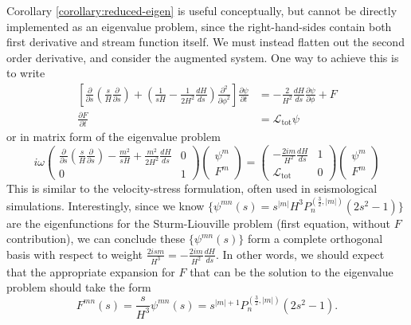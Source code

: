 Corollary \ref{corollary:reduced-eigen} is useful conceptually, but cannot be directly implemented as an eigenvalue problem, since the right-hand-sides contain both first derivative and stream function itself. We must instead flatten out the second order derivative, and consider the augmented system. One way to achieve this is to write
\begin{equation}\label{eqn:reduced-dim-form}
\begin{aligned}
    \left[\frac{\partial}{\partial s}\left(\frac{s}{H}\frac{\partial}{\partial s}\right) + \left(\frac{1}{sH} - \frac{1}{2H^2} \frac{dH}{ds}\right)\frac{\partial^2}{\partial \phi^2}\right] \frac{\partial \psi}{\partial t} &= - \frac{2}{H^2}\frac{dH}{ds} \frac{\partial \psi}{\partial \phi} + F \\ 
    \frac{\partial F}{\partial t} &= \mathcal{L}_\mathrm{tot} \psi
\end{aligned}
\end{equation}
or in matrix form of the eigenvalue problem
\begin{equation}\label{eqn:reduced-dim-matrix-form}
i\omega \begin{pmatrix}
    \frac{\partial}{\partial s}\left(\frac{s}{H}\frac{\partial}{\partial s}\right) - \frac{m^2}{sH} + \frac{m^2}{2H^2} \frac{dH}{ds} & 0 \\ 
    0 & 1
\end{pmatrix} \begin{pmatrix} \psi^m \\ F^m \end{pmatrix} = \begin{pmatrix} -\frac{2im}{H^2} \frac{dH}{ds} & 1 \\ \mathcal{L}_\mathrm{tot} & 0 \end{pmatrix} \begin{pmatrix}
    \psi^m \\ F^m
\end{pmatrix}
\end{equation}
This is similar to the velocity-stress formulation, often used in seismological simulations. Interestingly, since we know $\{\psi^{mn}(s) = s^{|m|}H^3 P_{n}^{(\frac{3}{2}, |m|)}(2s^2 - 1)\}$ are the eigenfunctions for the Sturm-Liouville problem (first equation, without $F$ contribution), we can conclude these $\{\psi^{mn}(s)\}$ form a complete orthogonal basis with respect to weight $\frac{2ism}{H^3} = -\frac{2im}{H^2}\frac{dH}{ds}$. In other words, we should expect that the appropriate expansion for $F$ that can be the solution to the eigenvalue problem should take the form
\[F^{mn}(s) = \frac{s}{H^3} \psi^{mn}(s) = s^{|m|+1} P_n^{(\frac{3}{2},|m|)}(2s^2 - 1).\]


